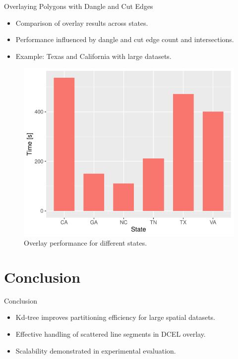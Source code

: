 \documentclass{beamer}
\begin{document}
\begin{frame}{Overlaying Polygons with Dangle and Cut Edges}
    \begin{itemize}
        \item Comparison of overlay results across states.
        \item Performance influenced by dangle and cut edge count and intersections.
        \item Example: Texas and California with large datasets.
    \end{itemize}
    \begin{figure}
        \includegraphics[width=0.5\linewidth]{chapterExtension/states} %
        \caption{Overlay performance for different states.}
    \end{figure}
\end{frame}

\section{Conclusion}
\begin{frame}{Conclusion}
    \begin{itemize}
        \item Kd-tree improves partitioning efficiency for large spatial datasets.
        \item Effective handling of scattered line segments in DCEL overlay.
        \item Scalability demonstrated in experimental evaluation.
    \end{itemize}
\end{frame}
\end{document}
